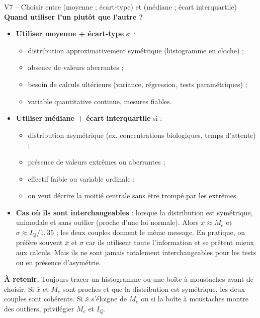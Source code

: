 \documentclass[11pt,a4paper]{article}
\begin{document}
\begin{vignetteCours}{V7 -- Choisir entre (moyenne ; écart-type) et (médiane ; écart interquartile)}
\medskip
\textbf{Quand utiliser l'un plutôt que l'autre ?}
\begin{itemize}[leftmargin=*,itemsep=1pt]
  \item \textbf{Utiliser moyenne + écart-type} si :
    \begin{itemize}[leftmargin=*,itemsep=0pt]
      \item distribution approximativement symétrique (histogramme en cloche) ;
      \item absence de valeurs aberrantes ;
      \item besoin de calculs ultérieurs (variance, régression, tests paramétriques) ;
      \item variable quantitative continue, mesures fiables.
    \end{itemize}
  \item \textbf{Utiliser médiane + écart interquartile} si :
    \begin{itemize}[leftmargin=*,itemsep=0pt]
      \item distribution asymétrique (ex. concentrations biologiques, temps d'attente) ;
      \item présence de valeurs extrêmes ou aberrantes ;
      \item effectif faible ou variable ordinale ;
      \item on veut décrire la moitié centrale sans être trompé par les extrêmes.
    \end{itemize}
  \item \textbf{Cas où ils sont interchangeables} : lorsque la distribution est symétrique, unimodale et sans outlier (proche d'une loi normale). Alors $\bar{x} \approx M_e$ et $\sigma \approx I_Q / 1{,}35$ ; les deux couples donnent le même message. En pratique, on préfère souvent $\bar{x}$ et $\sigma$ car ils utilisent toute l'information et se prêtent mieux aux calculs. Mais ils ne sont jamais totalement interchangeables pour les tests ou en présence d'asymétrie.
\end{itemize}

\medskip
\textbf{À retenir.} Toujours tracer un histogramme ou une boîte à moustaches avant de choisir. Si $\bar{x}$ et $M_e$ sont proches et que la distribution est symétrique, les deux couples sont cohérents. Si $\bar{x}$ s'éloigne de $M_e$ ou si la boîte à moustaches montre des outliers, privilégier $M_e$ et $I_Q$.
\end{vignetteCours}

\newpage

\end{document}
